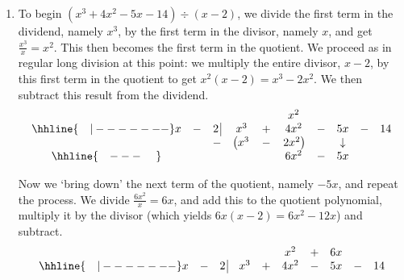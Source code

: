 \begin{exampleSol}

\begin{enumerate}

\item  To begin $\left(x^3 + 4x^2 - 5x - 14\right) \div (x-2)$, we divide the first term in the dividend, namely $x^3$, by the first term in the divisor, namely $x$, and get $\frac{x^3}{x} = x^2$. This then becomes the first term in the quotient.  We proceed as in regular long division at this point: we multiply the entire divisor, $x-2$, by this first term in the quotient to get $x^{2}(x - 2) = x^3 - 2x^2$.  We then subtract this result from the dividend.\setlength\arraycolsep{0.1pt}\setlength\extrarowheight{2pt}\[ \begin{array}{cccccccccc}

& & & & & x^2 & & &  &  \\ \hhline{~~~|-------}

x & - & 2 \, \vline& x^3 & + & 4x^2 & - & 5x & - & 14 \\

 &  &  -& \left(x^3 \right. & - & \left.  2x^2\right) &  & \downarrow &  &  \\ \hhline{~~~---~~~~} 
 &  &  &   &  & 6 x^2 & - & 5x &  &  \\ 
 
\end{array}\]

\setlength\arraycolsep{5pt}
\setlength\extrarowheight{0pt} 

Now we `bring down' the next term of the quotient, namely $-5x$, and repeat the process. We divide $\frac{6x^2}{x} = 6x$, and add this to the quotient polynomial, multiply it by the divisor (which yields $6x(x - 2) = 6x^{2} - 12x$) and subtract. \setlength\arraycolsep{0.1pt}\setlength\extrarowheight{2pt}\[ \begin{array}{cccccccccc}

& & & & & x^2 & + & 6x &  &  \\ \hhline{~~~|-------}

x & - & 2 \, \vline& x^3 & + & 4x^2 & - & 5x & - & 14 \\


\end{array}\]
\end{enumerate}
\end{exampleSol}
